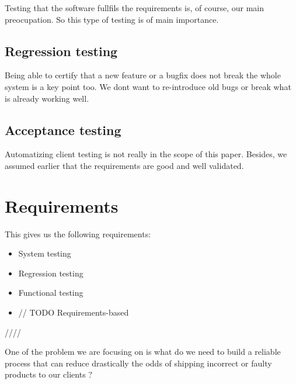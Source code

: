 \documentclass[12pt]{article}
\theoremstyle{definition}
\theoremstyle{definition}
\begin{document}
Testing that the software fullfils the requirements is, of course, our main preocupation. So this type of testing is of main importance.\\

\subsection{Regression testing}

Being able to certify that a new feature or a bugfix does not break the whole system is a key point too. We dont want to re-introduce old bugs or break what is already working well.\\

\subsection{Acceptance testing}

Automatizing client testing is not really in the scope of this paper. Besides, we assumed earlier that the requirements are good and well validated.\\


\section{Requirements}

This gives us the following requirements:

\begin{itemize}
\item System testing
\item Regression testing
\item Functional testing
\item // TODO Requirements-based
\end{itemize}



























////

One of the problem we are focusing on is what do we need to build a reliable process that can reduce drastically the odds of shipping incorrect or faulty products to our clients ?\\
\end{document}
